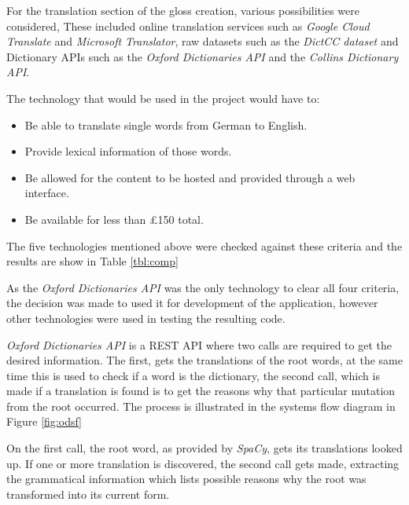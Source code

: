 For the translation section of the gloss creation, various possibilities were considered, These included online translation services such as \textit{Google Cloud Translate} and \textit{Microsoft Translator}, raw datasets such as the \textit{DictCC dataset} and Dictionary APIs such as the \textit{Oxford Dictionaries API} and the \textit{Collins Dictionary API}. 

The technology that would be used in the project would have to:
\begin{itemize}
\item Be able to translate single words from German to English.
\item Provide lexical information of those words.
\item Be allowed for the content to be hosted and provided through a web interface.
\item Be available for less than \pounds150 total.
\end{itemize}

The five technologies mentioned above were checked against these criteria and the results are show in Table \ref{tbl:comp}



As the \textit{Oxford Dictionaries API} was the only technology to clear all four criteria, the decision was made to used it for development of the application, however other technologies were used in testing the resulting code.

\textit{Oxford Dictionaries API} is a REST API where two calls are required to get the desired information. The first, gets the translations of the root words, at the same time this is used to check if a word is the dictionary, the second call, which is made if a translation is found is to get the reasons why that particular mutation from the root occurred.  The process is illustrated in the systems flow diagram in Figure \ref{fig:odsf}



On the first call, the root word, as provided by \textit{SpaCy}, gets its translations looked up. If one or more translation is discovered, the second call gets made, extracting the grammatical information which lists possible reasons why the root was transformed into its current form.

